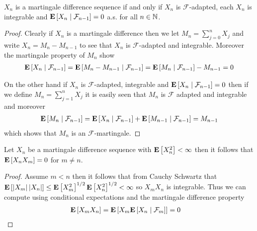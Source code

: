 \begin{prop}$X_n$ is a martingale difference sequence if and only if
  $X_n$ is $\mathcal{F}$-adapted, each $X_n$ is integrable and 
  $\cexpectationlong{\mathcal{F}_{n-1}}{X_n} = 0$ a.s. for all $n \in \naturals$.
\end{prop}
\begin{proof}
Clearly if $X_n$ is a martingale difference then we let $M_n =
\sum_{j=0}^n X_j$ and write $X_n = M_n - M_{n-1}$ to see that $X_n$ is
$\mathcal{F}$-adapted and integrable.  Moreover the martingale
property of $M_n$ show
\begin{align*}
\cexpectationlong{\mathcal{F}_{n-1}}{X_n} =
  \cexpectationlong{\mathcal{F}_{n-1}}{M_n - M_{n-1}} =
  \cexpectationlong{\mathcal{F}_{n-1}}{M_n }- M_{n-1} = 0
\end{align*}

On the other hand if $X_n$ is $\mathcal{F}$-adapted, integrable and
$\cexpectationlong{\mathcal{F}_{n-1}}{X_n} = 0$ then if we define $M_n
= \sum_{j=1}^n X_j$ it is easily seen that $M_n$ is $\mathcal{F}$
adapted and integrable and moreover
\begin{align*}
\cexpectationlong{\mathcal{F}_{n-1}}{M_n}  =
  \cexpectationlong{\mathcal{F}_{n-1}}{X_n}+
  \cexpectationlong{\mathcal{F}_{n-1}}{M_{n-1}}  = M_{n-1}
\end{align*}
which shows that $M_n$ is an $\mathcal{F}$-martingale.
\end{proof}

\begin{prop}\label{SquareIntegrableMartingaleDifferenceWhiteNoise}Let $X_n$ be a martingale difference sequence with
  $\expectation{X_n^2} < \infty$ then it follows that
  $\expectation{X_n X_m} = 0$ for $m \neq n$.
\end{prop}
\begin{proof}
Assume $m < n$ then it follows that from Cauchy Schwartz that
$\expectation{\abs{X_m} \abs{X_n}} \leq \expectation{X^2_m}^{1/2}
\expectation{X^2_n}^{1/2} < \infty$ so $X_m X_n$ is integrable.  Thus
we can compute using conditional expectations and the martingale
difference property
\begin{align}\label{MartingaleDifferenceLindebergCondition}
\expectation{X_m X_n} &= \expectation{X_m
                        \cexpectationlong{\mathcal{F}_m}{X_n} } = 0
\end{align}
\end{proof}

